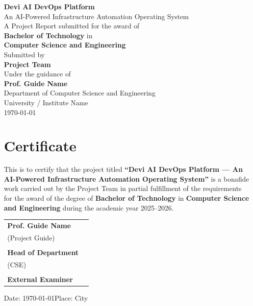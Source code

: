 \documentclass[12pt,a4paper]{report}
\begin{document}
\begin{titlepage}
\begin{center}
\vspace*{1.5cm}
{\Huge \textbf{Devi AI DevOps Platform}} \\[8pt]
{\Large An AI-Powered Infrastructure Automation Operating System} \\[20pt]
{\large A Project Report submitted for the award of} \\[4pt]
{\large \textbf{Bachelor of Technology} in} \\[4pt]
{\large \textbf{Computer Science and Engineering}} \\[20pt]
{\large Submitted by} \\[6pt]
{\large \textbf{Project Team}} \\[6pt]
{\large Under the guidance of} \\[6pt]
{\large \textbf{Prof. Guide Name}} \\[20pt]
{\large Department of Computer Science and Engineering} \\[6pt]
{\large University / Institute Name} \\[6pt]
{\large \today}
\end{center}
\end{titlepage}

\chapter*{Certificate}
\vspace{-0.5cm}
This is to certify that the project titled \textbf{``Devi AI DevOps Platform --- An AI-Powered Infrastructure Automation Operating System''} is a bonafide work carried out by the Project Team in partial fulfillment of the requirements for the award of the degree of \textbf{Bachelor of Technology} in \textbf{Computer Science and Engineering} during the academic year 2025--2026.

\vspace{0.5cm}
\begin{flushleft}
\begin{tabular}{p{6cm}l}
\textbf{Prof. Guide Name} & \\
(Project Guide) & \\
\vspace{0.6cm} & \\
\textbf{Head of Department} & \\
(CSE) & \\
\vspace{0.6cm} & \\
\textbf{External Examiner} & \\
\end{tabular}
\end{flushleft}
\vfill
\begin{center} Date: \today \qquad Place: City \end{center}
\newpage
\end{document}
